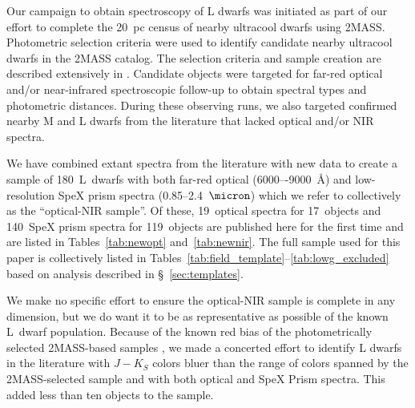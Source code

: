 \documentclass[12pt,preprint]{aastex}
\newcommand{\sample}{180}
\newcommand{\NewOptSpectra}{19} %
\newcommand{\NewOptObjects}{17} %
\newcommand{\NewPrismSpectra}{140} %
\newcommand{\NewPrismObjects}{119} %
\begin{document}
Our campaign to obtain spectroscopy of L dwarfs was initiated as part of our effort to complete the 20~pc census of nearby ultracool dwarfs using 2MASS. 
Photometric selection criteria were used to identify candidate nearby ultracool dwarfs in the 2MASS catalog. 
The selection criteria and sample creation are described extensively in \cite[Papers~III, V, and IX]{Cruz03,Cruz07,Reid08}. 
Candidate objects were targeted for far-red optical and/or near-infrared spectroscopic follow-up to obtain spectral types and photometric distances. 
During these observing runs, we also targeted confirmed nearby M and L dwarfs from the literature that lacked optical and/or NIR spectra.

We have combined extant spectra from the literature with new data to create a sample of \sample~L~dwarfs with both far-red optical (6000–-9000~\AA) and low-resolution SpeX prism spectra (0.85--2.4~$\micron$) which we refer to collectively as the ``optical-NIR sample''. 
Of these, \NewOptSpectra~optical spectra for \NewOptObjects~objects and \NewPrismSpectra~SpeX prism spectra for \NewPrismObjects~objects are published here for the first time and are listed in Tables~\ref{tab:newopt} and~\ref{tab:newnir}. 
The full sample used for this paper is collectively listed in Tables~\ref{tab:field_template}--\ref{tab:lowg_excluded} based on analysis described in \S~\ref{sec:templates}.

We make no specific effort to ensure the optical-NIR sample is complete in any dimension, but we do want it to be as representative as possible of the known L~dwarf population.
Because of the known red bias of the photometrically selected 2MASS-based samples \cite[Figure 3]{Schmidt10}, we made a concerted effort to identify L dwarfs in the literature with $J-K_S$ colors bluer than the range of colors spanned by the 2MASS-selected sample and with both optical and SpeX Prism spectra. 
This added less than ten objects to the sample.
\end{document}
